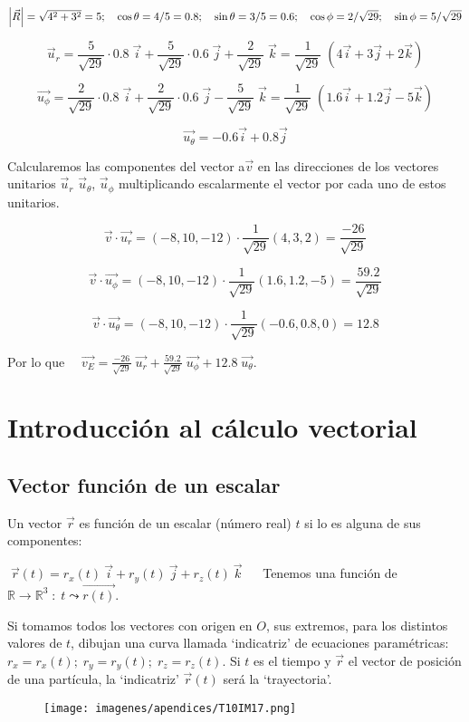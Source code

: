$\abs{\vec R}=\sqrt{4^2+3^2}=5; \quad \cos \theta =4/5=0.8;\quad \sin \theta=3/5=0.6;\quad \cos \phi=2/\sqrt{29};\quad \sin \phi=5/\sqrt{29}$

$$\vec u_r=\dfrac 5 {\sqrt{29}}\cdot 0.8 \; \vec i+\dfrac 5 {\sqrt{29}}\cdot 0.6 \; \vec j + \dfrac 2 {\sqrt{29}}\; \vec k = \dfrac  1{\sqrt{29}}\; (4\vec i+3\vec j+2\vec k)$$

$$ \vec {u_{\phi}}=\dfrac 2 {\sqrt{29}}\cdot 0.8 \;  \vec i + \dfrac 2 {\sqrt{29}}\cdot 0.6 \; \vec j - \dfrac 5 {\sqrt{29}}\; \vec k =
	\dfrac  1{\sqrt{29}}\; (1.6\vec i+1.2\vec j-5\vec k)$$

$$\vec {u_{\theta}}=-0.6\vec i+0.8 \vec j$$

Calcularemos las componentes del vector a$\vec v$ en las direcciones de los vectores unitarios $\vec u_{r}$ $\vec u_{\theta}$, $\vec u_{\phi}$ multiplicando escalarmente el vector por cada uno de estos unitarios.

$$ \vec v \cdot \vec {u_{r}}= (-8,10,-12)\cdot \frac 1 {\sqrt{29}} (4,3,2)=\frac {-26}{\sqrt{29}}$$ 

$$ \vec v \cdot \vec {u_{\phi}}= (-8,10,-12)\cdot \frac 1 {\sqrt{29}} (1.6,1.2,-5)=\frac {59.2}{\sqrt{29}}$$

$$ \vec v \cdot \vec {u_{\theta}}= (-8,10,-12)\cdot \frac 1 {\sqrt{29}} (-0.6,0.8,0)=12.8$$

Por lo que $\quad \vec {v_E}=\frac {-26}{\sqrt{29}}\; \vec {u_{r}}+ \frac {59.2}{\sqrt{29}}\; \vec {u_{\phi}}+ 12.8\; \vec {u_{\theta}}$.





\chapter{Introducción al cálculo vectorial}

\section{Vector función de un escalar}

\begin{multicols}{2}
Un vector $\vec r$ es función de un escalar (número real) $t$ si lo es alguna de sus componentes:

$\boxed{ \; \vec r(t)=r_x(t) \ \vec i + r_y(t) \ \vec j + r_z(t) \ \vec k \; } \quad$
Tenemos una función de $\mathbb R \to \mathbb R^3\; : \; t \leadsto \vec {r(t)}$. 

Si tomamos todos los vectores con origen en $O$, sus extremos, para los distintos valores de $t$, dibujan una curva llamada `indicatriz' de ecuaciones paramétricas: $r_x=r_x(t); \; r_y=r_y(t); \; r_z=r_z(t)$. Si $t$ es el tiempo y $\vec r$ el vector de posición de una partícula, la `indicatriz' $ \vec r (t)$ será la `trayectoria'.

	\begin{figure}[H]
	\centering
	\texttt{[image: imagenes/apendices/T10IM17.png]}
	\end{figure}
\end{multicols}

